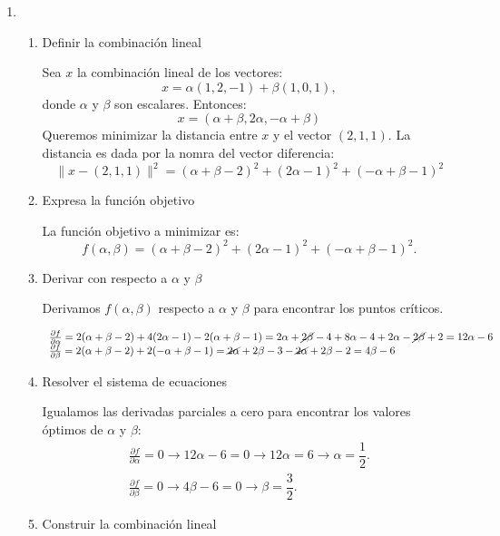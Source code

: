 \begin{enumerate}[label=\color{red}\textbf{\arabic*)}]
\begin{enumerate}[label=\underline{\arabic*ª forma:}]
\end{enumerate}
\item {}

    \begin{enumerate}[label=Paso \arabic*:]
        \item Definir la combinación lineal

            Sea $x$ la combinación lineal de los vectores: \[
            x=\alpha(1,2,-1)+\beta(1,0,1),
            \] donde $\alpha$ y $\beta$ son escalares. Entonces: \[
            x=(\alpha+\beta,2\alpha,-\alpha+\beta)
            \] 
            Queremos minimizar la distancia entre $x$ y el vector $(2,1,1)$. La distancia es dada por la nomra del vector diferencia:  \[
            \|x-(2,1,1)\|^2=(\alpha+\beta-2)^2+(2\alpha-1)^2+(-\alpha+\beta-1)^2
            \] 
        \item Expresa la función objetivo

            La función objetivo a minimizar es: \[
            f(\alpha,\beta)=(\alpha+\beta-2)^2+(2\alpha-1)^2+(-\alpha+\beta-1)^2.
            \] 
        \item Derivar con respecto a $\alpha$ y $\beta$

            Derivamos $f(\alpha,\beta)$ respecto a $\alpha$ y $\beta$ para encontrar los puntos críticos.

            \[
            \begin{array}{l}
                \frac{\partial f}{\partial \alpha} =2(\alpha+\beta-2)+4(2\alpha-1)-2(\alpha+\beta-1)=2\alpha+\cancel{2\beta}-4+8\alpha-4+2\alpha-\cancel{2\beta}+2=12\alpha-6\\
                \frac{\partial f}{\partial \beta} =2(\alpha+\beta-2)+2(-\alpha+\beta-1)=\cancel{2\alpha}+2\beta-3-\cancel{2\alpha}+2\beta-2=4\beta-6
            \end{array}
            \] 
        \item Resolver el sistema de ecuaciones

            Igualamos las derivadas parciales a cero para encontrar los valores óptimos de $\alpha$ y $\beta$: \[
            \begin{array}{l}
                \frac{\partial f}{\partial \alpha} =0\longrightarrow 12\alpha-6=0\longrightarrow 12\alpha=6\longrightarrow \alpha=\dfrac{1}{2}.\\
                \frac{\partial f}{\partial \beta} =0\longrightarrow 4\beta-6=0\longrightarrow \beta=\dfrac{3}{2}.
            \end{array}
            \] 
        \item Construir la combinación lineal


\end{enumerate}
\end{enumerate}
